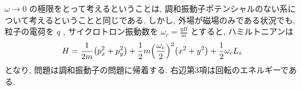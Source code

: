 \documentclass[../../ou-physics-exam.tex]{subfiles}
\begin{document}
\begin{supplement}
    $ \omega \to 0 $ の極限をとって考えるということは, 調和振動子ポテンシャルのない系について考えるということと同じである. 
    しかし, 外場が磁場のみである状況でも, 粒子の電荷を $ q $ , サイクロトロン振動数を $ \displaystyle \omega_c = \frac{qB}{m} $ とすると, ハミルトニアンは
    \begin{align*}
        H = \frac{1}{2m} \qty(p_x^2 + p_y^2) + \frac{1}{2} m \qty(\frac{\omega_c}{2})^2 \qty(x^2 + y^2) + \frac{1}{2} \omega_c L_z
    \end{align*}
    となり, 問題は調和振動子の問題に帰着する. 
    右辺第3項は回転のエネルギーである.
\end{supplement}
\end{document}
